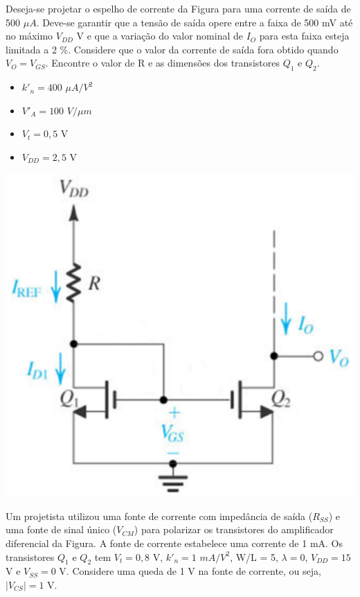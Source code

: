 \documentclass[addpoints]{exam}
\begin{document}
\begin{questions}
\question[4] Deseja-se projetar o espelho de corrente da Figura para uma corrente de saída de 500 $\mu A$. Deve-se garantir que a tensão de saída opere entre a faixa de 500 mV até no máximo $V_{DD}$ V e que a variação do valor nominal de $I_O$ para esta faixa esteja limitada a 2 \%. Considere que o valor da corrente de saída fora obtido quando $V_O = V_{GS}$. Encontre o valor de R e as dimensões dos transistores $Q_1$ e $Q_2$.

\begin{minipage}[t]{0.3\textwidth}
\begin{itemize}
    \item $k'_n = 400$ $\mu A/V^2$
    \item $V'_A = 100$ $V/\mu m$
    \item $V_t = 0,5$ V
    \item $V_{DD} = 2,5$ V
\end{itemize}
\end{minipage}
\hspace{5mm}
\begin{minipage}[m]{0.4\textwidth}
\includegraphics[width=\textwidth]{imagens/2.png}
\end{minipage}

\question Um projetista utilizou uma fonte de corrente com impedância de saída ($R_{SS}$) e uma fonte de sinal único ($V_{CM}$) para polarizar os transistores do amplificador diferencial da Figura. A fonte de corrente estabelece uma corrente de 1 mA. Os transistores $Q_1$ e $Q_2$ tem $V_t = 0,8$ V, $k'_n = 1$ $mA/V^2$, W/L = 5, $\lambda = 0$, $V_{DD} = 15$ V e $V_{SS} = 0$ V. Considere uma queda de 1 V na fonte de corrente, ou seja, $\vert V_{CS} \vert = 1$ V.


\end{questions}
\end{document}
